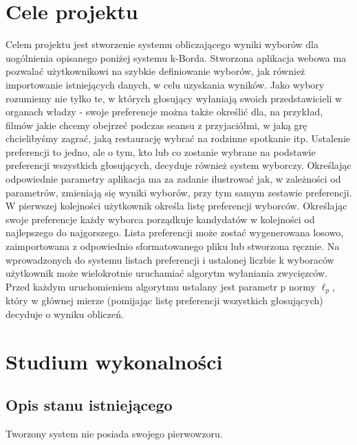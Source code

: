 \documentclass[pdflatex,11pt]{../aghdoc_version2}
\author{Tomasz Kasprzyk, Daniel Ogiela, Jakub Stępak}
\date{2016}
\begin{document}
\titlepages

\tableofcontents
\clearpage

%
%
\chapter{Cele projektu}
\label{cha:cele_projektu}
Celem projektu jest stworzenie systemu obliczającego wyniki wyborów dla uogólnienia opisanego poniżej systemu k-Borda. 
Stworzona aplikacja webowa ma pozwalać użytkownikowi na szybkie definiowanie wyborów, jak również importowanie istniejących danych, w celu uzyskania wyników. 
Jako wybory rozumiemy nie tylko te, w których głosujący wyłaniają swoich przedstawicieli w organach władzy - swoje preferencje można także określić dla, na przykład, filmów jakie chcemy obejrzeć podczas seansu z przyjaciółmi, w jaką grę chcielibyśmy zagrać, jaką restaurację wybrać na rodzinne spotkanie itp.
Ustalenie preferencji to jedno, ale o tym, kto lub co zostanie wybrane na podstawie preferencji wszystkich głosujących, decyduje również system wyborczy.
Określając odpowiednie parametry aplikacja ma za zadanie ilustrować jak, w zależności od parametrów, zmieniają się wyniki wyborów, przy tym samym zestawie preferencji.
W pierwszej kolejności użytkownik określa listę preferencji wyborców. Określając swoje preferencje każdy wyborca porządkuje kandydatów w kolejności od najlepszego do najgorszego. Lista preferencji może zostać wygenerowana losowo, zaimportowana z odpowiednio sformatowanego pliku lub stworzona ręcznie.
Na wprowadzonych do systemu listach preferencji i ustalonej liczbie k wyboraców użytkownik może wielokrotnie uruchamiać algorytm wyłaniania zwycięzców. Przed każdym uruchomieniem algorytmu ustalany jest parametr p normy $\ell_p$, który w głównej mierze (pomijając listę preferencji wszystkich głosujących) decyduje o wyniku obliczeń.


\chapter{Studium wykonalności}
\label{cha:studium_wykonalnosci}

\section{Opis stanu istniejącego}
\label{sec:opis_stanu_istniejacego}
Tworzony system nie posiada swojego pierwowzoru.
\end{document}

